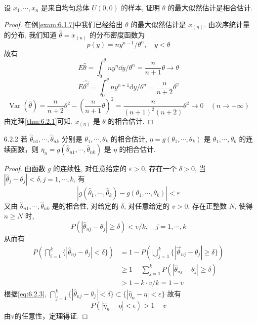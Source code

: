 \begin{example}\label{exam:6.2.2}
设 $x_1,\cdots,x_n$ 是来自均匀总体 $U(0,0)$ 的样本, 证明 $\theta$ 的最大似然估计是相合估计.
\end{example}
\begin{proof}
在例\ref{exam:6.1.7}中我们已经给出 $\theta$ 的最大似然估计是 $x_{(n)}$.  由次序统计量的分布, 我们知道 $\hat{\theta}=x_{(n)}$ 的分布密度函数为
\[p(y)=n y^{n-1} / \theta^{n}, \quad y<\theta\]
故有
\[E \hat{\theta}=\int_{0}^{\theta} n y^{n}\dd y / \theta^{n}=\frac{n}{n+1} \theta \rightarrow \theta\]
\[E \hat{\theta^{2}}=\int_{0}^{\theta} n y^{n+1} \mathrm{d} y / \theta^{n}=\frac{n}{n+2} \theta^{2}\]
\[\operatorname{Var}(\hat{\theta})=\frac{n}{n+2} \theta^{2}-\left(\frac{n}{n+1} \theta\right)^{2}=\frac{n}{(n+1)^{2}(n+2)} \theta^{2} \rightarrow 0 \quad(n \rightarrow+\infty)\]
由定理\ref{thm:6.2.1}可知,  $x_{(n)}$ 是 $\theta$ 的相合估计.
\end{proof}

\begin{theorem}{}{6.2.2} %
若 $\hat{\theta}_{n1},\cdots,\hat{\theta}_{nk}$ 分别是 $\theta_1,\cdots,\theta_k$ 的相合估计, $\eta=g(\theta_1,\cdots,\theta_k)$ 是 $\theta_1,\cdots,\theta_k$ 的连续函数，则 $\bar{\eta}_n=g(\hat{\theta}_{n1},\cdots,\hat{\theta}_{nk})$ 是 $\eta$ 的相合估计.
\end{theorem}
\begin{proof}
由函数 $g$ 的连续性, 对任意给定的 $\varepsilon>0$, 存在一个 $\delta>0$, 当 $|\hat{\theta}_j-\theta_j|<\delta,j=1,\cdots,k$, 有
\begin{equation}\label{eq:6.2.3}
|g(\hat{\theta}_{1}, \cdots, \hat{\theta}_{k})-g(\theta_{1}, \cdots, \theta_{k})|<\varepsilon
\end{equation}
又由 $\hat{\theta}_{n1},\cdots,\hat{\theta}_{nk}$ 是的相合性, 对给定的 $\delta$, 对任意给定的 $v>0$, 存在正整数 $N$, 使得 $n\geqslant N$ 时,
\[P(|\hat{\theta}_{n j}-\theta_{j}| \geqslant \delta)<v / k, \quad j=1, \cdots, k\]
从而有
\begin{align*}
P\left(\bigcap_{i=1}^{k}\{|\hat{\theta}_{n j}-\theta_{j}|<\delta\}\right)
&=1-P\left(\bigcup_{j=1}^{k}\{ | \vec{\theta}_{n j}-\theta_{j} | \geqslant \delta\}\right)\\
&\geqslant 1-\sum_{j=1}^{k} P(|\hat{\theta}_{n j}-\theta_{j}| \geqslant \delta)\\
&>1-k \cdot v / k=1-v
\end{align*}
根据\eqref{eq:6.2.3}, $\bigcap_{j=1}^{k}\{|\hat{\theta}_{n j}-\theta_{j}|<\delta\} \subset\{ | \hat{\eta}_{n}-\eta |<\varepsilon \}$ 故有
\[P\left(\left|\hat{\eta}_{n}-\eta\right|<\epsilon\right)>1-v\]
由v的任意性，定理得证.
\end{proof}


